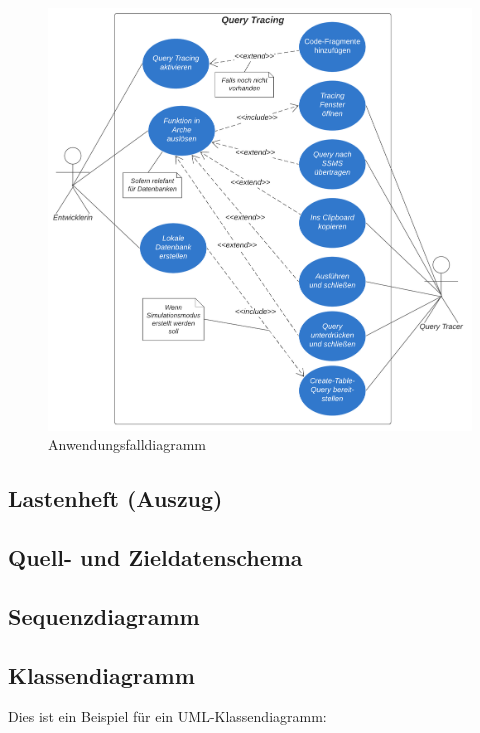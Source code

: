 \documentclass[11pt,toc=sectionentrywithoutdots, 
headheight=44pt, headings=optiontoheadandtoc, hyperfootnotes=false, hypertexnames=false]{scrartcl}
\begin{document}
 \begin{figure}[htp]

	\includegraphics[scale=1.1]{Anwendungsfalldiagramm.png}
	 \caption{Anwendungsfalldiagramm}
 \end{figure}
 \clearpage
 

\subsection{Lastenheft (Auszug)}
\blindtext\blindtext

\subsection{Quell- und Zieldatenschema}
\blindtext\blindtext

\subsection{Sequenzdiagramm}
\blindtext


\subsection{Klassendiagramm}

Dies ist ein Beispiel für ein UML-Klassendiagramm:\\
\end{document}
